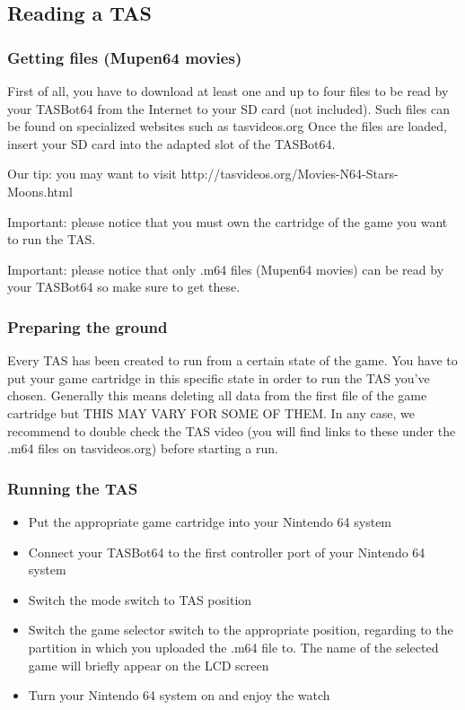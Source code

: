 \documentclass[a4paper,oneside,12pt]{article}
\begin{document}
\subsection{Reading a TAS}
\subsubsection{Getting files (Mupen64 movies)}
First of all, you have to download at least one and up to four files to be read 
by your TASBot64 from the Internet to your SD card (not included). Such files 
can be found on specialized websites such as tasvideos.org
Once the files are loaded, insert your SD card into the adapted slot of the 
TASBot64.

Our tip: you may want to visit http://tasvideos.org/Movies-N64-Stars-Moons.html

Important: please notice that you must own the cartridge of the game you want 
to run the TAS.

Important: please notice that only .m64 files (Mupen64 movies) can be read by 
your TASBot64 so make sure to get these.

\subsubsection{Preparing the ground}
Every TAS has been created to run from a certain state of the game. You have to 
put your game cartridge in this specific state in order to run the TAS you've 
chosen. Generally this means deleting all data from the first file of the game 
cartridge but THIS MAY VARY FOR SOME OF THEM. In any case, we recommend to 
double check the TAS video (you will find links to these under the .m64 files 
on tasvideos.org) before starting a run.

\subsubsection{Running the TAS}
\begin{itemize}
\item Put the appropriate game cartridge into your Nintendo 64 system
\item Connect your TASBot64 to the first controller port of your Nintendo 64 
system
\item Switch the mode switch to TAS position
\item Switch the game selector switch to the appropriate position, regarding to 
the partition in which you uploaded the .m64 file to. The name of the selected 
game will briefly appear on the LCD screen
\item Turn your Nintendo 64 system on and enjoy the watch
\end{itemize}
\end{document}
